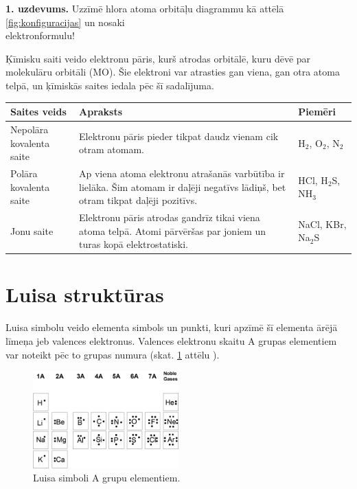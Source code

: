 \documentclass[12pt,a4paper]{article}
\begin{document}
\textbf{1. uzdevums.} Uzzīmē hlora atoma orbitāļu diagrammu kā attēlā \ref{fig:konfiguracijas} un nosaki \\ elektronformulu!

Ķīmisku saiti veido elektronu pāris, kurš atrodas orbitālē, kuru dēvē par molekulāru orbitāli (MO). Šie elektroni var atrasties gan viena, gan otra atoma telpā, un ķīmiskās saites iedala pēc šī sadalījuma.

\begin{table}[H]
\centering
\begin{tabularx}{\textwidth}{|
    >{\raggedright\arraybackslash}p{4.5cm}|
    >{\raggedright\arraybackslash}X|
    >{\raggedright\arraybackslash}p{3cm}|}
\hline
\textbf{Saites veids} & \textbf{Apraksts} & \textbf{Piemēri} \\
\hline
Nepolāra kovalenta saite & Elektronu pāris pieder tikpat daudz vienam cik otram atomam. & H$_2$, O$_2$, N$_2$ \\
\hline
Polāra kovalenta saite & Ap viena atoma elektronu atrašanās varbūtība ir lielāka. Šim atomam ir daļēji negatīvs lādiņš, bet otram tikpat daļēji pozitīvs. & HCl, H$_2$S, NH$_3$ \\
\hline
Jonu saite & Elektronu pāris atrodas gandrīz tikai viena atoma telpā. Atomi pārvēršas par joniem un turas kopā elektrostatiski. & NaCl, KBr, Na$_2$S \\
\hline
\end{tabularx}
\end{table}


\section{Luisa struktūras}

Luisa simbolu veido elementa simbols un punkti, kuri apzīmē šī elementa ārējā līmeņa jeb valences elektronus. Valences elektronu skaitu A grupas elementiem var noteikt pēc to grupas numura (skat. \ref{fig:luisa_simboli} attēlu ).

\begin{figure}[H]
    \centering
    \includegraphics[width=0.5\textwidth]{atteli/Luisa_simboli.png}
    \caption{Luisa simboli A grupu elementiem.}
    \label{fig:luisa_simboli}
\end{figure}
\end{document}
